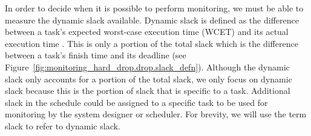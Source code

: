 In order to decide when it is possible to perform monitoring, we must be able
to measure the dynamic slack available.  Dynamic slack is defined as the
difference between a task's expected worst-case execution time (WCET) and its
actual execution time \cite{multi_task_visa-rtss04}. This is only a
portion of the total slack which is the difference between a task's finish time
and its deadline (see Figure~\ref{fig:monitoring_hard_drop.drop.slack_defn}).
Although the dynamic slack only accounts for a portion of the total slack, we
only focus on dynamic slack because this is the portion of slack that is
specific to a task.  Additional slack in the schedule could be assigned to a
specific task to be used for monitoring by the system designer or scheduler.
For brevity, we will use the term slack to refer to dynamic slack.

